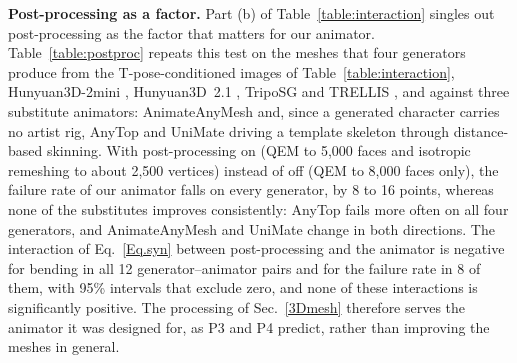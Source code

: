 \documentclass[lettersize,journal]{IEEEtran}
\newenvironment{revblock}{\par\color{red}}{\par}
\begin{document}
\begin{revblock}
\textbf{Post-processing as a factor.} Part (b) of Table~\ref{table:interaction} singles out
post-processing as the factor that matters for our animator. Table~\ref{table:postproc} repeats
this test on the meshes that four generators produce from the T-pose-conditioned images of
Table~\ref{table:interaction}, Hunyuan3D-2mini \cite{zhao2025hunyuan3d}, Hunyuan3D~2.1
\cite{hunyuan3d2025hunyuan3d}, TripoSG \cite{li2025triposg} and TRELLIS \cite{xiang2025structured},
and against three substitute animators: AnimateAnyMesh \cite{wu2025animateanymesh} and, since a
generated character carries no artist rig, AnyTop \cite{gat2025anytop} and UniMate
\cite{mou2026unimate} driving a template skeleton through distance-based skinning. With
post-processing on (QEM to 5,000 faces and isotropic remeshing to about 2,500 vertices) instead of
off (QEM to 8,000 faces only), the failure rate of our animator falls on every generator, by 8 to
16 points, whereas none of the substitutes improves consistently: AnyTop fails more often on all
four generators, and AnimateAnyMesh and UniMate change in both directions. The interaction of
Eq.~\ref{Eq.syn} between post-processing and the animator is negative for bending in all 12
generator--animator pairs and for the failure rate in 8 of them, with 95\% intervals that exclude
zero, and none of these interactions is significantly positive. The processing of
Sec.~\ref{3Dmesh} therefore serves the animator it was designed for, as P3 and P4 predict, rather
than improving the meshes in general.
\end{revblock}
\end{document}
